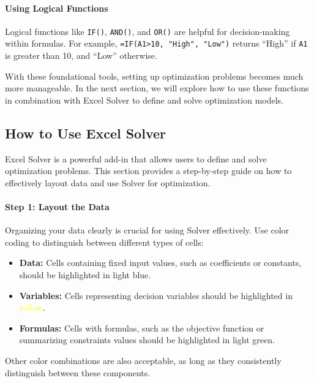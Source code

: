 \paragraph{Using Logical Functions}

Logical functions like \texttt{IF()}, \texttt{AND()}, and \texttt{OR()} are helpful for decision-making within formulas. For example, \texttt{=IF(A1>10, "High", "Low")} returns ``High'' if \texttt{A1} is greater than 10, and ``Low'' otherwise.

With these foundational tools, setting up optimization problems becomes much more manageable. In the next section, we will explore how to use these functions in combination with Excel Solver to define and solve optimization models.

\subsection{How to Use Excel Solver}

Excel Solver is a powerful add-in that allows users to define and solve optimization problems. This section provides a step-by-step guide on how to effectively layout data and use Solver for optimization.

\paragraph{Step 1: Layout the Data}
Organizing your data clearly is crucial for using Solver effectively. Use color coding to distinguish between different types of cells:
\begin{itemize}
    \item \textbf{Data:} Cells containing fixed input values, such as coefficients or constants, should be highlighted in \textcolor{blue!50!white}{light blue}.
    \item \textbf{Variables:} Cells representing decision variables should be highlighted in \textcolor{yellow}{yellow}.
        \item \textbf{Formulas:} Cells with formulas, such as the objective function or summarizing constraints values should be highlighted in \textcolor{green!50!white}{light green}.
\end{itemize}
Other color combinations are also acceptable, as long as they consistently distinguish between these components.

{\centering
{}\par{}\label{fig:excel-solver-layout}%
\par}

